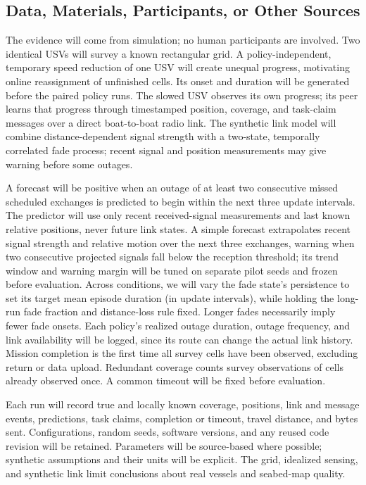 \subsection{Data, Materials, Participants, or Other Sources}

The evidence will come from simulation; no human participants are involved. Two identical USVs will survey a known rectangular grid. A policy-independent, temporary speed reduction of one USV will create unequal progress, motivating online reassignment of unfinished cells. Its onset and duration will be generated before the paired policy runs. The slowed USV observes its own progress; its peer learns that progress through timestamped position, coverage, and task-claim messages over a direct boat-to-boat radio link. The synthetic link model will combine distance-dependent signal strength with a two-state, temporally correlated fade process; recent signal and position measurements may give warning before some outages.

A forecast will be positive when an outage of at least two consecutive missed scheduled exchanges is predicted to begin within the next three update intervals. The predictor will use only recent received-signal measurements and last known relative positions, never future link states. A simple forecast extrapolates recent signal strength and relative motion over the next three exchanges, warning when two consecutive projected signals fall below the reception threshold; its trend window and warning margin will be tuned on separate pilot seeds and frozen before evaluation. Across conditions, we will vary the fade state's persistence to set its target mean episode duration (in update intervals), while holding the long-run fade fraction and distance-loss rule fixed. Longer fades necessarily imply fewer fade onsets. Each policy's realized outage duration, outage frequency, and link availability will be logged, since its route can change the actual link history. Mission completion is the first time all survey cells have been observed, excluding return or data upload. Redundant coverage counts survey observations of cells already observed once. A common timeout will be fixed before evaluation.

Each run will record true and locally known coverage, positions, link and message events, predictions, task claims, completion or timeout, travel distance, and bytes sent. Configurations, random seeds, software versions, and any reused code revision will be retained. Parameters will be source-based where possible; synthetic assumptions and their units will be explicit. The grid, idealized sensing, and synthetic link limit conclusions about real vessels and seabed-map quality.
